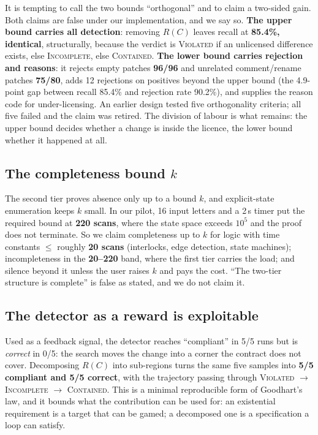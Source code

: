 \documentclass[acmsmall,screen,review,anonymous]{acmart}
\begin{document}
It is tempting to call the two bounds ``orthogonal'' and to claim a two-sided gain. Both claims are false under our implementation, and we say so. \textbf{The upper bound carries all detection}: removing $R(C)$ leaves recall at \textbf{85.4\%, identical}, structurally, because the verdict is \textsc{Violated} if an unlicensed difference exists, else \textsc{Incomplete}, else \textsc{Contained}. \textbf{The lower bound carries rejection and reasons}: it rejects empty patches \textbf{96/96} and unrelated comment/rename patches \textbf{75/80}, adds 12 rejections on positives beyond the upper bound (the 4.9-point gap between recall 85.4\% and rejection rate 90.2\%), and supplies the reason code for under-licensing. An earlier design tested five orthogonality criteria; all five failed and the claim was retired. The division of labour is what remains: the upper bound decides whether a change is inside the licence, the lower bound whether it happened at all.

\subsection{The completeness bound $k$}

The second tier proves absence only up to a bound $k$, and explicit-state enumeration keeps $k$ small. In our pilot, 16 input letters and a 2\,s timer put the required bound at \textbf{220 scans}, where the state space exceeds $10^5$ and the proof does not terminate. So we claim completeness up to $k$ for logic with time constants $\le$ roughly \textbf{20 scans} (interlocks, edge detection, state machines); incompleteness in the \textbf{20--220} band, where the first tier carries the load; and silence beyond it unless the user raises $k$ and pays the cost. ``The two-tier structure is complete'' is false as stated, and we do not claim it.

\subsection{The detector as a reward is exploitable}

Used as a feedback signal, the detector reaches ``compliant'' in 5/5 runs but is \emph{correct} in 0/5: the search moves the change into a corner the contract does not cover. Decomposing $R(C)$ into sub-regions turns the same five samples into \textbf{5/5 compliant and 5/5 correct}, with the trajectory passing through \textsc{Violated} $\to$ \textsc{Incomplete} $\to$ \textsc{Contained}. This is a minimal reproducible form of Goodhart's law, and it bounds what the contribution can be used for: an existential requirement is a target that can be gamed; a decomposed one is a specification a loop can satisfy.
\end{document}
